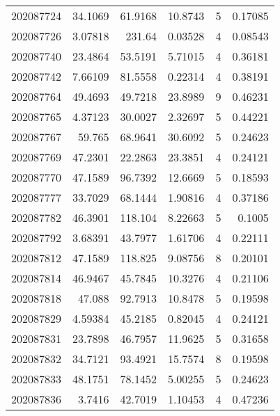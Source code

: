 \begin{tabular}{rrrrrr}
 202087724 &         34.1069  &       61.9168 &           10.8743  &           5 & 0.17085 \\
 202087726 &          3.07818 &      231.64   &            0.03528 &           4 & 0.08543 \\
 202087740 &         23.4864  &       53.5191 &            5.71015 &           4 & 0.36181 \\
 202087742 &          7.66109 &       81.5558 &            0.22314 &           4 & 0.38191 \\
 202087764 &         49.4693  &       49.7218 &           23.8989  &           9 & 0.46231 \\
 202087765 &          4.37123 &       30.0027 &            2.32697 &           5 & 0.44221 \\
 202087767 &         59.765   &       68.9641 &           30.6092  &           5 & 0.24623 \\
 202087769 &         47.2301  &       22.2863 &           23.3851  &           4 & 0.24121 \\
 202087770 &         47.1589  &       96.7392 &           12.6669  &           5 & 0.18593 \\
 202087777 &         33.7029  &       68.1444 &            1.90816 &           4 & 0.37186 \\
 202087782 &         46.3901  &      118.104  &            8.22663 &           5 & 0.1005  \\
 202087792 &          3.68391 &       43.7977 &            1.61706 &           4 & 0.22111 \\
 202087812 &         47.1589  &      118.825  &            9.08756 &           8 & 0.20101 \\
 202087814 &         46.9467  &       45.7845 &           10.3276  &           4 & 0.21106 \\
 202087818 &         47.088   &       92.7913 &           10.8478  &           5 & 0.19598 \\
 202087829 &          4.59384 &       45.2185 &            0.82045 &           4 & 0.24121 \\
 202087831 &         23.7898  &       46.7957 &           11.9625  &           5 & 0.31658 \\
 202087832 &         34.7121  &       93.4921 &           15.7574  &           8 & 0.19598 \\
 202087833 &         48.1751  &       78.1452 &            5.00255 &           5 & 0.24623 \\
 202087836 &          3.7416  &       42.7019 &            1.10453 &           4 & 0.47236 \\

\end{tabular}
